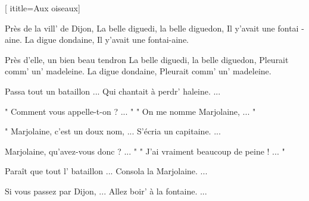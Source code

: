 [
ititle={Aux oiseaux}]

\beginverse
Près de la vill' de Dijon,
La belle diguedi, la belle diguedon,
Il y'avait une fontai -aine.
La digue dondaine,
Il y'avait une fontai-aine.
\endverse

\beginverse
Près d'elle, un bien beau tendron
La belle diguedi, la belle diguedon,
Pleurait comm' un' madeleine.
La digue dondaine,
Pleurait comm' un' madeleine.
\endverse

\beginverse
Passa tout un bataillon ...
Qui chantait à perdr' haleine. ...
\endverse

\beginverse
" Comment vous appelle-t-on ? ... "
" On me nomme Marjolaine, ... "
\endverse

\beginverse
" Marjolaine, c'est un doux nom, ...
S'écria un capitaine. ...
\endverse

\beginverse
Marjolaine, qu'avez-vous donc ? ... "
" J'ai vraiment beaucoup de peine ! ... "
\endverse

\beginverse
Paraît que tout l' bataillon ...
Consola la Marjolaine. ...
\endverse

\beginverse
Si vous passez par Dijon, ...
Allez boir' à la fontaine. ...
\endverse

\endsong